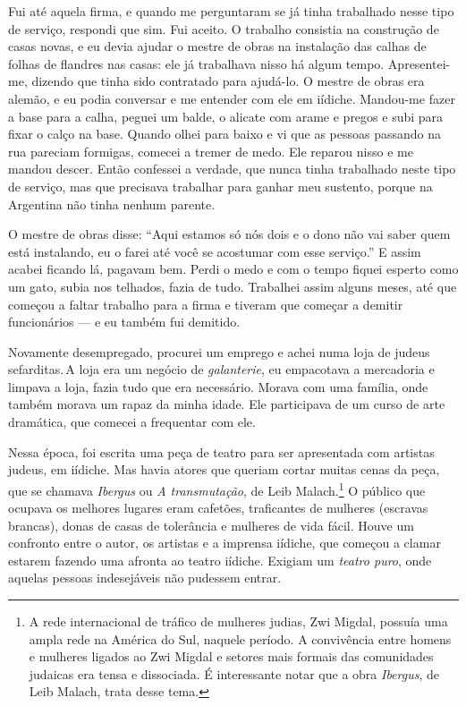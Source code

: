 Fui até aquela firma, e quando me perguntaram se já tinha
trabalhado nesse tipo de serviço, respondi que sim. Fui aceito. O
trabalho consistia na construção de casas novas, e eu devia ajudar o mestre
de obras na instalação das calhas de folhas de flandres nas casas: ele já trabalhava nisso há algum tempo. 
Apresentei-me, dizendo
que tinha sido contratado para ajudá-lo. O mestre de obras era alemão, e eu
podia conversar e me entender com ele em iídiche. Mandou-me fazer a base
para a calha, peguei um balde, o alicate com arame e pregos e subi para
fixar o calço na base. Quando olhei para baixo e vi que as pessoas
passando na rua pareciam formigas, comecei a tremer de medo. Ele
reparou nisso e me mandou descer. Então confessei a verdade, que
nunca tinha trabalhado neste tipo de serviço, mas que precisava
trabalhar para ganhar meu sustento, porque na Argentina não
tinha nenhum parente.

O mestre de obras disse: ``Aqui estamos só nós dois e o dono não vai
saber quem está instalando, eu o farei até você se acostumar com esse
serviço.'' E assim acabei ficando lá, pagavam bem. Perdi o medo e
com o tempo fiquei esperto como um gato, subia nos telhados, fazia de
tudo. Trabalhei assim alguns meses, até que começou a faltar trabalho
para a firma e tiveram que começar a demitir funcionários --- e eu também fui demitido.

Novamente desempregado, procurei um emprego e achei numa loja de judeus
sefarditas.\,A loja era um negócio de \textit{galanterie}, eu empacotava a
mercadoria e limpava a loja, fazia tudo que era necessário. Morava com
uma família, onde também morava um rapaz da minha idade. Ele
participava de um curso de arte dramática, que comecei a frequentar com ele.

Nessa época, foi escrita uma peça de teatro para ser apresentada 
com artistas judeus, em iídiche. Mas havia atores que queriam cortar muitas cenas da peça, que se chamava \textit{Ibergus} ou \textit{A transmutação}, de Leib Malach.\footnote{A rede
  internacional de tráfico de mulheres judias, Zwi Migdal, possuía uma
  ampla rede na América do Sul, naquele período. A convivência entre
  homens e mulheres ligados ao Zwi Migdal e setores mais formais das
  comunidades judaicas era tensa e dissociada. É interessante notar que
  a obra \textit{Ibergus}, de Leib Malach, trata desse tema.} O público que ocupava os melhores lugares eram cafetões, traficantes de mulheres (escravas brancas), donas de casas de tolerância e mulheres de vida fácil. Houve um confronto
entre o autor, os artistas e a imprensa iídiche, que começou a clamar
estarem fazendo uma afronta ao teatro iídiche. Exigiam um \textit{teatro puro}, onde aquelas pessoas indesejáveis não pudessem entrar.


